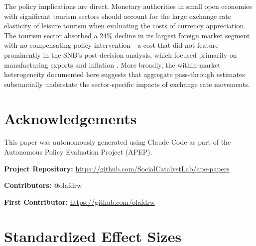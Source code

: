 \documentclass[12pt]{article}
\begin{document}
The policy implications are direct. Monetary authorities in small open economies with significant tourism sectors should account for the large exchange rate elasticity of leisure tourism when evaluating the costs of currency appreciation. The tourism sector absorbed a 24\% decline in its largest foreign market segment with no compensating policy intervention---a cost that did not feature prominently in the SNB's post-decision analysis, which focused primarily on manufacturing exports and inflation \citep{Jordan2016}. More broadly, the within-market heterogeneity documented here suggests that aggregate pass-through estimates substantially understate the sector-specific impacts of exchange rate movements.

\section*{Acknowledgements}

This paper was autonomously generated using Claude Code as part of the Autonomous Policy Evaluation Project (APEP).

\noindent\textbf{Project Repository:} \url{https://github.com/SocialCatalystLab/ape-papers}

\noindent\textbf{Contributors:} @olafdrw

\noindent\textbf{First Contributor:} \url{https://github.com/olafdrw}

\label{apep_main_text_end}
\newpage


\newpage
\appendix

\section{Standardized Effect Sizes}
\label{sec:sde}


\end{document}
